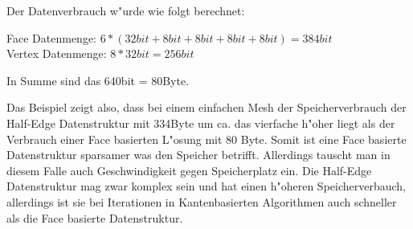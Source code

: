 \documentclass[pagesize, paper=a4, fontsize=12pt,titlepage=true, headings=small, headnosepline, abstractoff, liststotoc, nochapterprefix, plainheadsepline]{scrreprt}
\newcommand{\HES}{Half-Edge Datenstruktur }
\begin{document}
Der Datenverbrauch w"urde wie folgt berechnet:

	Face Datenmenge: \begin{math}6 * (32bit + 8bit + 8bit + 8bit + 8bit) = 384bit\end{math}
	\\
	Vertex Datenmenge: \begin{math}8 * 32bit = 256bit\end{math}

	In Summe sind das 640bit = 80Byte.
\newline

Das Beispiel zeigt also, dass bei einem einfachen Mesh der Speicherverbrauch der \HES mit 334Byte um ca. das vierfache h"oher liegt als der Verbrauch einer Face basierten L"osung mit 80 Byte. Somit ist eine Face basierte Datenstruktur sparsamer was den Speicher betrifft. Allerdings tauscht man in diesem Falle auch Geschwindigkeit gegen Speicherplatz ein. Die \HES mag zwar komplex sein und hat einen h"oheren Speicherverbauch, allerdings ist sie bei Iterationen in Kantenbasierten Algorithmen auch schneller als die Face basierte Datenstruktur.
\end{document}
